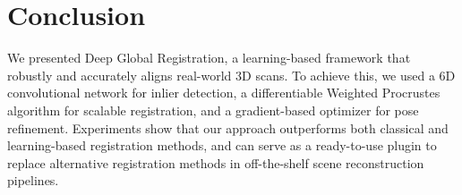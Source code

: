 \documentclass[10pt,twocolumn,letterpaper]{article}
\begin{document}
\section{Conclusion}

We presented Deep Global Registration, a learning-based framework that robustly and accurately aligns real-world 3D scans. To achieve this, we used a 6D convolutional network for inlier detection, a differentiable Weighted Procrustes algorithm for scalable registration, and a gradient-based optimizer for pose refinement. Experiments show that our approach outperforms both classical and learning-based registration methods, and can serve as a ready-to-use plugin to replace alternative registration methods in off-the-shelf scene reconstruction pipelines.

{\small


}
\end{document}
